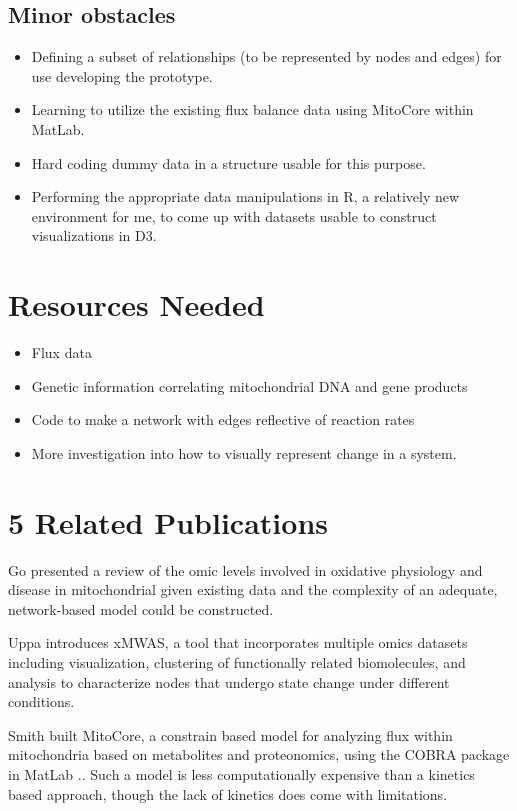 \documentclass{proc}	%
\begin{document}
\subsection{Minor obstacles}
\begin{itemize}
  \item Defining a subset of relationships (to be represented by nodes and edges) for use developing the prototype.
   \item Learning to utilize the existing flux balance data using MitoCore within MatLab.
   \item Hard coding dummy data in a structure usable for this purpose.
  \item Performing the appropriate data manipulations in R, a relatively new environment for me, to come up with datasets usable to construct visualizations in D3.
\end{itemize}
\section{Resources Needed}
\begin{itemize}
  \item Flux data
  \item Genetic information correlating mitochondrial DNA and gene products
  \item Code to make a network with edges reflective of reaction rates
  \item More investigation into how to visually represent change in a system.
\end{itemize}
\section{5 Related Publications}
Go presented a review of the omic levels involved in oxidative physiology and disease in mitochondrial given existing data and the complexity of an adequate, network-based model could be constructed\cite{Go2018}.

Uppa introduces xMWAS, a tool that incorporates multiple omics datasets including visualization, clustering of functionally related biomolecules, and analysis to characterize nodes that undergo state change under different conditions\cite{Uppal2018}.

Smith built MitoCore, a constrain based model for analyzing flux within mitochondria based on metabolites and proteonomics, using the COBRA package in MatLab \cite{Smith2017}.. Such a model is less computationally expensive than a kinetics based approach, though the lack of kinetics does come with limitations\cite{Orth2010}.
\end{document}
